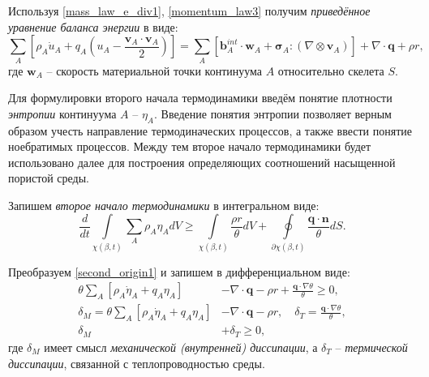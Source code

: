 	Используя \eqref{mass_law_e_div1}, \eqref{momentum_law3} получим \textit{приведённое уравнение баланса энергии} в виде:
\begin{equation}
	\label{energy_law4}
	\sum\limits_{A}\left[\rho_A \dot{u}_A + q_A\left(u_A - \frac{\boldsymbol{v}_A \cdot \boldsymbol{v}_A}{2}\right)\right] = 
	\sum\limits_{A}\left[\boldsymbol{b}_A^{int}\cdot \boldsymbol{w}_A + \boldsymbol{\sigma}_A : (\nabla \otimes \boldsymbol{v}_A)\right] + 
	\nabla \cdot \boldsymbol{q} + \rho r,
\end{equation}
	где $\boldsymbol{w}_A$ -- скорость материальной точки континуума $A$ относительно скелета $S$.

	Для формулировки второго начала термодинамики введём понятие плотности \textit{энтропии} континуума $A$ -- $\eta_A$.
	Введение понятия энтропии позволяет верным образом учесть направление термодиначеских процессов, а также ввести понятие ноебратимых процессов.
	Между тем второе начало термодинамики будет использовано далее для построения определяющих соотношений насыщенной пористой среды.

	Запишем \textit{второе начало термодинамики} в интегральном виде:
\begin{equation}
	\label{second_origin1}
	\frac{d}{dt}\int\limits_{\chi(\beta,t)}\sum\limits_A \rho_A \eta_A dV \geq \int\limits_{\chi(\beta, t)}\frac{\rho r}{\theta}dV + \oint\limits_{\partial\chi(\beta, t)}\frac{\boldsymbol{q}\cdot \boldsymbol{n}}{\theta}dS.
\end{equation}

	Преобразуем \eqref{second_origin1} и запишем в дифференциальном виде:
\begin{align}
	\label{second_origin2}
	\theta\sum\limits_{A}\left[\rho_A \dot{\eta}_A + q_A \eta_A\right] &- \nabla \cdot \boldsymbol{q} - \rho r + \frac{\boldsymbol{q}\cdot\nabla\theta}{\theta} \geq 0,\\
	\delta_M = \theta\sum\limits_{A}\left[\rho_A \dot{\eta}_A + q_A \eta_A\right] &- \nabla \cdot \boldsymbol{q} - \rho r, \quad \delta_T = \frac{\boldsymbol{q}\cdot\nabla\theta}{\theta},\\
	\delta_M &+ \delta_T \geq 0,
\end{align}
	где $\delta_M$ имеет смысл \textit{механической (внутренней) диссипации}, 
	а $\delta_T$ -- \textit{термической диссипации}, связанной с теплопроводностью среды.

